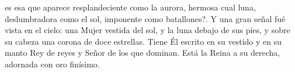  es esa que aparece resplandeciente como la aurora, hermosa cual luna, deslumbradora como el sol, imponente como batallones?.
Y una gran señal fué vista en el cielo: una Mujer vestida del sol, y la luna debajo de sus  pies, y sobre su cabeza una corona de doce estrellas.
Tiene Él escrito en su vestido y en su manto Rey de reyes y Señor de los que dominan. Está la Reina a su derecha, adornada con oro finísimo.